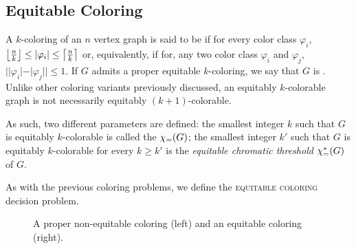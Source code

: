 \subsection{Equitable Coloring}
A $k$-coloring of an $n$ vertex graph is said to be  if for every color class $\varphi_i$, $\left\lfloor\frac{n}{k}\right\rfloor \leq |\varphi_i| \leq \left\lceil\frac{n}{k}\right\rceil$ or, equivalently, if for, any two color class $\varphi_i$ and $\varphi_j$, $||\varphi_i| - |\varphi_j|| \leq 1$.
If $G$ admits a proper equitable $k$-coloring, we say that $G$ is .
Unlike other coloring variants previously discussed, an equitably $k$-colorable graph is not necessarily equitably $(k+1)$-colorable.

As such, two different parameters are defined: the smallest integer $k$ such that $G$ is equitably $k$-colorable is called the  $\chi_{\mathcal{=}}(G)$; the smallest integer $k'$ such that $G$ is equitably $k$-colorable for every $k \geq k'$ is the \textit{equitable chromatic threshold} $\chi_{\mathcal{=}}^*(G)$ of $G$.

As with the previous coloring problems, we define the \textsc{equitable coloring} decision problem.



\begin{figure}[!htb]
    \centering
    \hfill
    \hfill
    
    \caption{A proper non-equitable coloring (left) and an equitable coloring (right).}
    \label{fig:eq_color}
\end{figure}


